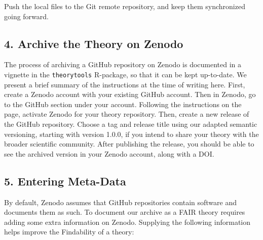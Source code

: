\documentclass[
  man,floatsintext]{apa6}
\begin{document}
Push the local files to the Git remote repository, and keep them synchronized going forward.

\subsection{4. Archive the Theory on Zenodo}\label{archive-the-theory-on-zenodo}

The process of archiving a GitHub repository on Zenodo is documented in a vignette in the \texttt{theorytools} R-package, so that it can be kept up-to-date.
We present a brief summary of the instructions at the time of writing here.
First, create a Zenodo account with your existing GitHub account.
Then in Zenodo, go to the GitHub section under your account.
Following the instructions on the page, activate Zenodo for your theory repository.
Then, create a new release of the GitHub repository.
Choose a tag and release title using our adapted semantic versioning, starting with version 1.0.0, if you intend to share your theory with the broader scientific community.
After publishing the release,
you should be able to see the archived version in your Zenodo account,
along with a DOI.

\subsection{5. Entering Meta-Data}\label{entering-meta-data}

By default, Zenodo assumes that GitHub repositories contain software and documents them as such.
To document our archive as a FAIR theory requires adding some extra information on Zenodo.
Supplying the following information helps improve the Findability of a theory:
\end{document}
